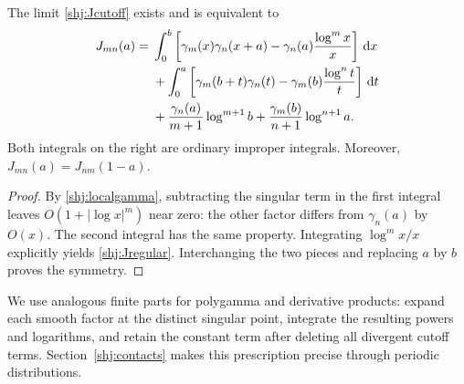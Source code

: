 \begin{lemma}\label{shj:Jexists}
The limit \eqref{shj:Jcutoff} exists and is equivalent to
\begin{align}
J_{mn}(a)={}&\int_0^b\left[
\gamma_m(x)\gamma_n(x+a)-\gamma_n(a)\frac{\log^m x}{x}\right]\,\mathrm{d} x\notag\\
&+\int_0^a\left[
\gamma_m(b+t)\gamma_n(t)-\gamma_m(b)\frac{\log^n t}{t}\right]\,\mathrm{d} t\notag\\
&+\frac{\gamma_n(a)}{m+1}\log^{m+1}b
+\frac{\gamma_m(b)}{n+1}\log^{n+1}a.
\label{shj:Jregular}
\end{align}
Both integrals on the right are ordinary improper integrals. Moreover,
$J_{mn}(a)=J_{nm}(1-a)$.
\end{lemma}
\begin{proof}
By \eqref{shj:localgamma}, subtracting the singular term in the first integral leaves $O(1+|\log x|^m)$ near zero: the other factor differs from $\gamma_n(a)$ by $O(x)$. The second integral has the same property. Integrating $\log^m x/x$ explicitly yields \eqref{shj:Jregular}. Interchanging the two pieces and replacing $a$ by $b$ proves the symmetry.
\end{proof}
We use analogous finite parts for polygamma and derivative products: expand each smooth factor at the distinct singular point, integrate the resulting powers and logarithms, and retain the constant term after deleting all divergent cutoff terms. Section~\ref{shj:contacts} makes this prescription precise through periodic distributions.

